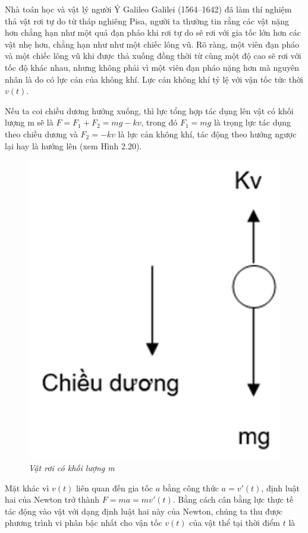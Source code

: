 Nhà toán học và vật lý người Ý Galileo Galilei (1564–1642) đã làm thí nghiệm thả vật rơi tự do từ tháp nghiêng Pisa, người ta thường tin rằng các vật nặng hơn chẳng hạn như một quả đạn pháo khi rơi tự do sẽ rơi với gia tốc lớn hơn các vật nhẹ hơn, chẳng hạn như như một chiếc lông vũ. Rõ ràng, một viên đạn pháo và một chiếc lông vũ khi được thả xuống đồng thời từ cùng một độ cao sẽ rơi với tốc độ khác nhau, nhưng không phải vì một viên đạn pháo nặng hơn mà nguyên nhân là do có lực cản của không khí. Lực cản không khí tỷ lệ với vận tốc tức thời $v(t)$.

Nếu ta coi chiều dương hướng xuống, thì lực tổng hợp tác dụng lên vật có khối lượng $\mathrm{m}$ sẽ là $F=F_1+F_2=m g-k v$, trong đó $F_1=m g$ là trọng lực tác dụng theo chiều dương và $F_2=-k v$ là lực cản không khí, tác động theo hướng ngược lại hay là hướng lên (xem Hình 2.20).
\begin{figure}[H]
	\centering
	\includegraphics[scale=0.5]{Images/hinh_2_20.png}
	\caption[Vật rơi có khối lượng m
	]{\itshape\fontsize{13pt}{0pt}\selectfont\centering Vật rơi có khối lượng m}
	\label{hinh2.20}
\end{figure} 
Mặt khác vì $v(t)$ liên quan đến gia tốc $a$ bằng công thức  $a=v'(t)$, định luật hai của Newton trở thành $F=ma=mv'(t)$. Bằng cách cân bằng lực thực tế tác động vào vật  với dạng định luật hai này của Newton, chúng ta thu được phương trình vi phân bậc nhất cho vận tốc $v(t)$ của vật thể tại thời điểm $t$ là   
